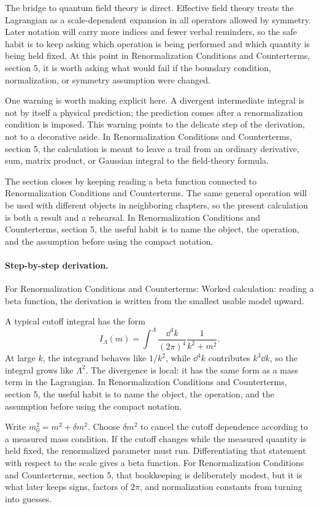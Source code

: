 The bridge to quantum field theory is direct.  Effective field theory treats the Lagrangian as a scale-dependent expansion in all operators allowed by symmetry.  Later notation will carry more indices and fewer verbal reminders, so the safe habit is to keep asking which operation is being performed and which quantity is being held fixed.  At this point in Renormalization Conditions and Counterterms, section 5, it is worth asking what would fail if the boundary condition, normalization, or symmetry assumption were changed.

One warning is worth making explicit here.  A divergent intermediate integral is not by itself a physical prediction; the prediction comes after a renormalization condition is imposed.  This warning points to the delicate step of the derivation, not to a decorative aside.  In Renormalization Conditions and Counterterms, section 5, the calculation is meant to leave a trail from an ordinary derivative, sum, matrix product, or Gaussian integral to the field-theory formula.

The section closes by keeping reading a beta function connected to Renormalization Conditions and Counterterms.  The same general operation will be used with different objects in neighboring chapters, so the present calculation is both a result and a rehearsal.  In Renormalization Conditions and Counterterms, section 5, the useful habit is to name the object, the operation, and the assumption before using the compact notation.



\paragraph{Step-by-step derivation.}

For Renormalization Conditions and Counterterms: Worked calculation: reading a beta function, the derivation is written from the smallest usable model upward.

A typical cutoff integral has the form
\[
  I_\Lambda(m)=\int^{\Lambda}\frac{\dd^4k}{(2\pi)^4}\frac{1}{k^2+m^2}.
\]
At large \(k\), the integrand behaves like \(1/k^2\), while \(\dd^4k\) contributes \(k^3\dd k\), so the integral grows like \(\Lambda^2\).  The divergence is local: it has the same form as a mass term in the Lagrangian.  In Renormalization Conditions and Counterterms, section 5, the useful habit is to name the object, the operation, and the assumption before using the compact notation.

Write \(m_0^2=m^2+\delta m^2\).  Choose \(\delta m^2\) to cancel the cutoff dependence according to a measured mass condition.  If the cutoff changes while the measured quantity is held fixed, the renormalized parameter must run.  Differentiating that statement with respect to the scale gives a beta function.  For Renormalization Conditions and Counterterms, section 5, that bookkeeping is deliberately modest, but it is what later keeps signs, factors of \(2\pi\), and normalization constants from turning into guesses.

